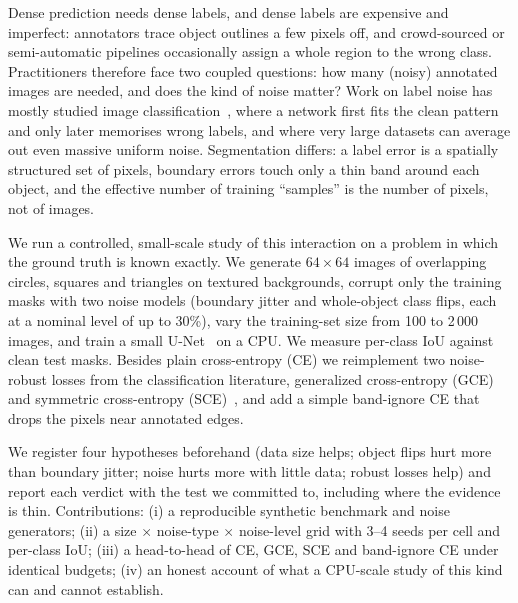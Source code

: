 Dense prediction needs dense labels, and dense labels are expensive and imperfect: annotators trace object outlines a few pixels off, and crowd-sourced or semi-automatic pipelines occasionally assign a whole region to the wrong class. Practitioners therefore face two coupled questions: how many (noisy) annotated images are needed, and does the kind of noise matter? Work on label noise has mostly studied image classification~\cite{zhang2016understanding,arpit2017closer,rolnick2017deep,song2020learning}, where a network first fits the clean pattern and only later memorises wrong labels, and where very large datasets can average out even massive uniform noise. Segmentation differs: a label error is a spatially structured set of pixels, boundary errors touch only a thin band around each object, and the effective number of training ``samples'' is the number of pixels, not of images.

We run a controlled, small-scale study of this interaction on a problem in which the ground truth is known exactly. We generate $64\times64$ images of overlapping circles, squares and triangles on textured backgrounds, corrupt only the training masks with two noise models (boundary jitter and whole-object class flips, each at a nominal level of up to 30\%), vary the training-set size from 100 to 2\,000 images, and train a small U-Net~\cite{ronneberger2015u} on a CPU. We measure per-class IoU against clean test masks. Besides plain cross-entropy (CE) we reimplement two noise-robust losses from the classification literature, generalized cross-entropy (GCE)~\cite{zhang2018generalized} and symmetric cross-entropy (SCE)~\cite{wang2019symmetric}, and add a simple band-ignore CE that drops the pixels near annotated edges.

We register four hypotheses beforehand (data size helps; object flips hurt more than boundary jitter; noise hurts more with little data; robust losses help) and report each verdict with the test we committed to, including where the evidence is thin. Contributions: (i) a reproducible synthetic benchmark and noise generators; (ii) a size $\times$ noise-type $\times$ noise-level grid with 3--4 seeds per cell and per-class IoU; (iii) a head-to-head of CE, GCE, SCE and band-ignore CE under identical budgets; (iv) an honest account of what a CPU-scale study of this kind can and cannot establish.
